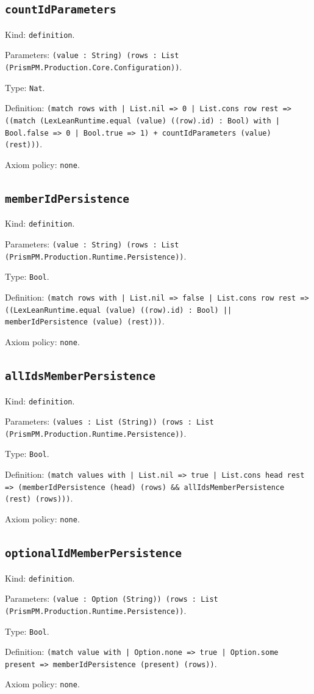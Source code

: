 \documentclass[11pt]{article}
\begin{document}
\subsection*{\texttt{countIdParameters}}
\noindent Kind: \texttt{definition}.\par
\noindent Parameters: \texttt{(value : String) (rows : List (PrismPM.Production.Core.Configuration))}.\par
\noindent Type: \texttt{Nat}.\par
\noindent Definition: \texttt{(match rows with | List.nil => 0 | List.cons row rest => ((match (LexLeanRuntime.equal (value) ((row).id) : Bool) with | Bool.false => 0 | Bool.true => 1) + countIdParameters (value) (rest)))}.\par
\noindent Axiom policy: \texttt{none}.\par
\subsection*{\texttt{memberIdPersistence}}
\noindent Kind: \texttt{definition}.\par
\noindent Parameters: \texttt{(value : String) (rows : List (PrismPM.Production.Runtime.Persistence))}.\par
\noindent Type: \texttt{Bool}.\par
\noindent Definition: \texttt{(match rows with | List.nil => false | List.cons row rest => ((LexLeanRuntime.equal (value) ((row).id) : Bool) || memberIdPersistence (value) (rest)))}.\par
\noindent Axiom policy: \texttt{none}.\par
\subsection*{\texttt{allIdsMemberPersistence}}
\noindent Kind: \texttt{definition}.\par
\noindent Parameters: \texttt{(values : List (String)) (rows : List (PrismPM.Production.Runtime.Persistence))}.\par
\noindent Type: \texttt{Bool}.\par
\noindent Definition: \texttt{(match values with | List.nil => true | List.cons head rest => (memberIdPersistence (head) (rows) \&\& allIdsMemberPersistence (rest) (rows)))}.\par
\noindent Axiom policy: \texttt{none}.\par
\subsection*{\texttt{optionalIdMemberPersistence}}
\noindent Kind: \texttt{definition}.\par
\noindent Parameters: \texttt{(value : Option (String)) (rows : List (PrismPM.Production.Runtime.Persistence))}.\par
\noindent Type: \texttt{Bool}.\par
\noindent Definition: \texttt{(match value with | Option.none => true | Option.some present => memberIdPersistence (present) (rows))}.\par
\noindent Axiom policy: \texttt{none}.\par
\end{document}
